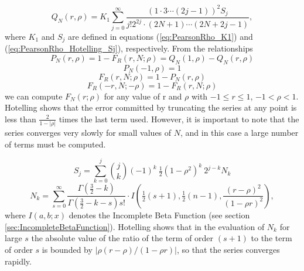 \begin{equation}
	Q_N(r,\rho) = K_1 \sum_{j=0}^{\infty}{\frac{(1 \cdot 3 \cdots (2j-1))^2 S_j}{j! 2^{2j} \cdot (2N+1) \cdots (2N+2j-1)}},
\end{equation}
where $K_1$ and $S_j$ are defined in equations (\ref{eq:PearsonRho_K1}) and (\ref{eq:PearsonRho_Hotelling_Sj}), respectively. From the relationships
\begin{equation}
	P_N(r, \rho) = 1-F_R(r, N; \rho) = Q_N(1,\rho)-Q_N(r,\rho)
\end{equation}
\begin{equation}
	P_N(-1, \rho) = 1
\end{equation}
\begin{equation}
	F_R(r, N; \rho) = 1 -P_N(r, \rho)
\end{equation}
\begin{equation}
	F_R(-r, N; -\rho) = 1 -F_R(r, N; \rho)
\end{equation}
we can compute $F_N(r;\rho)$ for any value of r and $\rho$ with $-1 \leq r \leq 1$, $-1<\rho<1$.
Hotelling shows that the error committed by truncating the series at any point is less than $\frac{2}{1-|\rho|}$ times the last term used. However, it is important to note that the series converges very slowly for small values of $N$, and in this case a large number of terms must be computed.

\begin{equation}  \label{eq:PearsonRho_Hotelling_Sj}
	S_j = \sum_{k=0}^{j} \binom{j}{k}(-1)^k \: \tfrac{1}{2} (1-\rho^2)^k \: 2^{j-k}  N_k
\end{equation}
\begin{equation}
	N_k = \sum_{s=0}^{\infty} \frac{\Gamma\left(\tfrac{3}{2}-k\right)}{\Gamma\left(\tfrac{3}{2}-k-s\right) s!} \cdot I \left(\tfrac{1}{2}(s+1), \tfrac{1}{2}(n-1),\frac{(r-\rho)^2}{(1-\rho r)^2}\right),
\end{equation} 
where $I(a,b;x)$ denotes the Incomplete Beta Function (see section \ref{sec:IncompleteBetaFunction}). Hotelling shows that in the evaluation of $N_k$ for large $s$ the absolute value of the ratio of the term of order $(s+1)$ to the term of order $s$ is bounded by $|\rho (r-\rho)/(1-\rho r)|$, so that the series converges rapidly.


